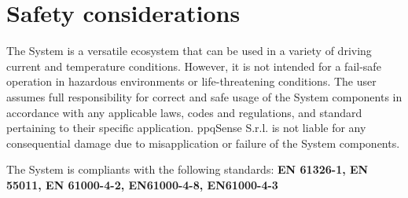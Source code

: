 \section{Safety considerations}
The \QubeModel  System is a versatile ecosystem that can be used in a variety of driving current and temperature conditions. However, it is not intended for a fail-safe operation in hazardous environments or life-threatening conditions. The user assumes full responsibility for correct and safe usage of the \QubeModel  System components in accordance with any applicable laws, codes and regulations, and standard pertaining to their specific application. ppqSense S.r.l. is not liable for any consequential damage due to misapplication or failure of the \QubeModel  System components.

The \QubeModel  System is compliants with the following standards: 
\newline
\textbf{EN 61326-1, EN 55011, EN 61000-4-2, EN61000-4-8, EN61000-4-3}